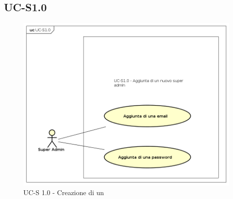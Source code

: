 \subsection{UC-S1.0}
    \begin{figure}[H]
      \begin{center}
        \includegraphics[width=12cm]{res/img/UCSuperadmin/UCS1.0.png}
      \caption{UC-S 1.0 - Creazione di un }
      \end{center} 
    \end{figure}    
    
